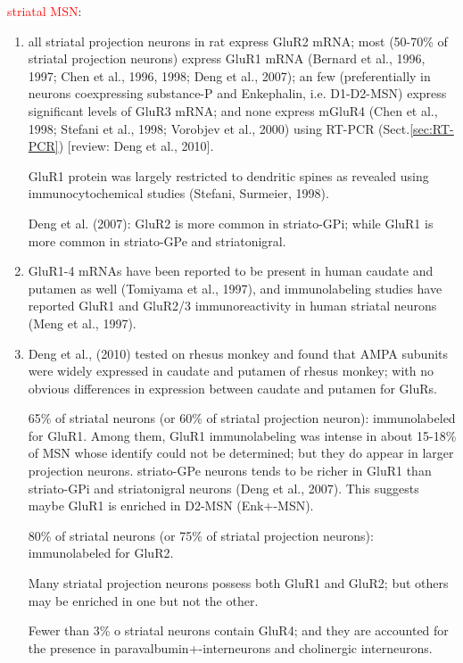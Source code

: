 \textcolor{red}{striatal MSN}:
\begin{enumerate}
  
  \item all striatal projection neurons in rat express GluR2 mRNA; most (50-70\%
  of striatal projection neurons) express GluR1 mRNA (Bernard et al., 1996,
  1997; Chen et al., 1996, 1998; Deng et al., 2007); an few (preferentially in
  neurons coexpressing substance-P and Enkephalin, i.e. D1-D2-MSN) express
  significant levels of GluR3 mRNA; and none express mGluR4 (Chen et al., 1998;
  Stefani et al., 1998; Vorobjev et al., 2000) using RT-PCR
  (Sect.\ref{sec:RT-PCR}) [review: Deng et al., 2010].
  
  GluR1 protein was largely restricted to dendritic spines as revealed using
  immunocytochemical studies (Stefani, Surmeier, 1998).
  
  Deng et al. (2007): GluR2 is more common in striato-GPi; while GluR1 is more
  common in striato-GPe and striatonigral.
  
  \item GluR1-4 mRNAs have been reported to be present in human caudate and
  putamen as well (Tomiyama et al., 1997), and immunolabeling studies have
  reported GluR1 and GluR2/3 immunoreactivity in human striatal neurons (Meng et
  al., 1997).

  \item Deng et al., (2010) tested on rhesus monkey and found that AMPA subunits
  were widely expressed in caudate and putamen of rhesus monkey; with no obvious
  differences in expression between caudate and putamen for GluRs.
  
  65\% of striatal neurons (or 60\% of striatal projection neuron):
  immunolabeled for GluR1. Among them, GluR1 immunolabeling was intense in about
  15-18\% of MSN whose identify could not be determined; but they do appear in
  larger projection neurons. striato-GPe neurons tends to be richer in GluR1
  than striato-GPi and striatonigral neurons (Deng et al., 2007). This suggests
  maybe GluR1 is enriched in D2-MSN (Enk+-MSN).
  
  80\% of striatal neurons (or 75\% of striatal projection neurons):
  immunolabeled for GluR2.
  
  Many striatal projection neurons possess both GluR1 and GluR2; but others may
  be enriched in one but not the other.
  
  Fewer than 3\% o striatal neurons contain GluR4; and they are accounted for
  the presence in paravalbumin+-interneurons and cholinergic interneurons.
  
\end{enumerate}

